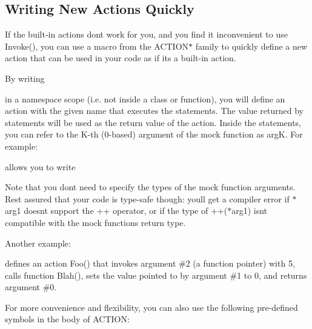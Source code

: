 \subsection*{Writing New Actions Quickly}

If the built-\/in actions don\textquotesingle{}t work for you, and you find it inconvenient to use {\ttfamily Invoke()}, you can use a macro from the {\ttfamily A\+C\+T\+I\+O\+N$\ast$} family to quickly define a new action that can be used in your code as if it\textquotesingle{}s a built-\/in action.

By writing 
\begin{DoxyCode}{0}
\end{DoxyCode}
 in a namespace scope (i.\+e. not inside a class or function), you will define an action with the given name that executes the statements. The value returned by {\ttfamily statements} will be used as the return value of the action. Inside the statements, you can refer to the K-\/th (0-\/based) argument of the mock function as {\ttfamily argK}. For example\+: 
\begin{DoxyCode}{0}
\end{DoxyCode}
 allows you to write 
\begin{DoxyCode}{0}
\end{DoxyCode}


Note that you don\textquotesingle{}t need to specify the types of the mock function arguments. Rest assured that your code is type-\/safe though\+: you\textquotesingle{}ll get a compiler error if {\ttfamily $\ast$arg1} doesn\textquotesingle{}t support the {\ttfamily ++} operator, or if the type of {\ttfamily ++($\ast$arg1)} isn\textquotesingle{}t compatible with the mock function\textquotesingle{}s return type.

Another example\+: 
\begin{DoxyCode}{0}
\DoxyCodeLine{\}}
\end{DoxyCode}
 defines an action {\ttfamily Foo()} that invokes argument \#2 (a function pointer) with 5, calls function {\ttfamily Blah()}, sets the value pointed to by argument \#1 to 0, and returns argument \#0.

For more convenience and flexibility, you can also use the following pre-\/defined symbols in the body of {\ttfamily A\+C\+T\+I\+ON}\+:

